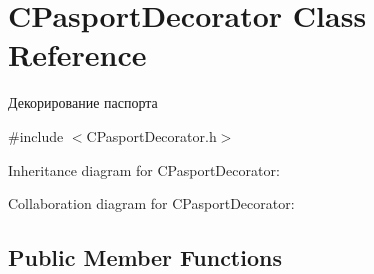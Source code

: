 \hypertarget{classCPasportDecorator}{}\section{C\+Pasport\+Decorator Class Reference}
\label{classCPasportDecorator}


Декорирование паспорта  




{\ttfamily \#include $<$C\+Pasport\+Decorator.\+h$>$}



Inheritance diagram for C\+Pasport\+Decorator\+:


Collaboration diagram for C\+Pasport\+Decorator\+:
\subsection*{Public Member Functions}

